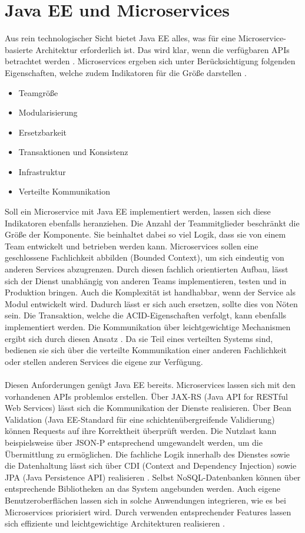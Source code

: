 \section{Java EE und Microservices}
Aus rein technologischer Sicht bietet Java EE alles, was für eine Microservice-basierte Architektur erforderlich ist. Das wird klar, wenn die verfügbaren APIs betrachtet werden \cite{jaxcenter.2016}. Microservices ergeben sich unter Berücksichtigung folgenden Eigenschaften, welche zudem Indikatoren für die Größe darstellen \cite{EberhardWolff.2015}.
\begin{itemize}
	\item Teamgröße
	\item Modularisierung
	\item Ersetzbarkeit
	\item Transaktionen und Konsistenz
	\item Infrastruktur
	\item Verteilte Kommunikation	
\end{itemize}
Soll ein Microservice mit Java EE implementiert werden, lassen sich diese Indikatoren ebenfalls heranziehen. Die Anzahl der Teammitglieder beschränkt die Größe der Komponente. Sie beinhaltet dabei so viel Logik, dass sie von einem Team entwickelt und betrieben werden kann. Microservices sollen eine geschlossene Fachlichkeit abbilden (Bounded Context), um sich eindeutig von anderen Services abzugrenzen. Durch diesen fachlich orientierten Aufbau, lässt sich der Dienst unabhängig von anderen Teams implementieren, testen und in Produktion bringen. Auch die Komplexität ist handhabbar, wenn der Service als Modul entwickelt wird. Dadurch lässt er sich auch ersetzen, sollte dies von Nöten sein. Die Transaktion, welche die ACID-Eigenschaften verfolgt, kann ebenfalls implementiert werden. Die Kommunikation über leichtgewichtige Mechanismen ergibt sich durch diesen Ansatz \cite{EberhardWolff.2015}. Da sie Teil eines verteilten Systems sind, bedienen sie sich über die verteilte Kommunikation einer anderen Fachlichkeit oder stellen anderen Services die eigene zur Verfügung. \\ \\
Diesen Anforderungen genügt Java EE bereits. Microservices lassen sich mit den vorhandenen APIs problemlos erstellen. Über JAX-RS (Java API for RESTful Web Services) lässt sich die Kommunikation der Dienste realisieren. Über Bean Validation (Java EE-Standard für eine schichtenübergreifende Validierung) können Requests auf ihre Korrektheit überprüft werden. Die Nutzlast kann beispielsweise über JSON-P entsprechend umgewandelt werden, um die Übermittlung zu ermöglichen. Die fachliche Logik innerhalb des Dienstes sowie die Datenhaltung lässt sich über CDI (Context and Dependency Injection) sowie JPA (Java Persistence API) realisieren \cite{LarsRowekamp.2017d}. Selbst NoSQL-Datenbanken können über entsprechende Bibliotheken an das System angebunden werden. Auch eigene Benutzeroberflächen lassen sich in solche Anwendungen integrieren, wie es bei Microservices priorisiert wird. Durch verwenden entsprechender Features lassen sich effiziente und leichtgewichtige Architekturen realisieren \cite{jaxcenter.2016}.\\ \\
